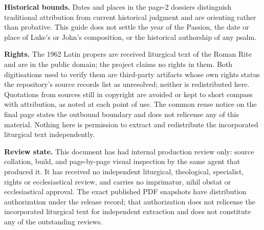 \textbf{Historical bounds.} Dates and places in the page-2 dossiers
distinguish traditional attribution from current historical judgment and are
orienting rather than probative. This guide does not settle the year of the
Passion, the date or place of Luke's or John's composition, or the historical
authorship of any psalm.

\textbf{Rights.} The 1962 Latin propers are received liturgical text of the
Roman Rite and are in the public domain; the project claims no rights in them.
Both digitisations used to verify them are third-party artifacts whose own
rights status the repository's source records list as unresolved; neither is
redistributed here. Quotations from sources still in copyright are avoided or
kept to short compass with attribution, as noted at each point of use. The
common reuse notice on the final page states the outbound boundary and does
not relicense any of this material. Nothing here is permission to extract and
redistribute the incorporated liturgical text independently.

\textbf{Review state.} This document has had internal production review only:
source collation, build, and page-by-page visual inspection by the same agent
that produced it. It has received no independent liturgical, theological,
specialist, rights or ecclesiastical review, and carries no imprimatur, nihil
obstat or ecclesiastical approval. The exact published PDF snapshots have
distribution authorization under the release record; that authorization does
not relicense the incorporated liturgical text for independent extraction and
does not constitute any of the outstanding reviews.
